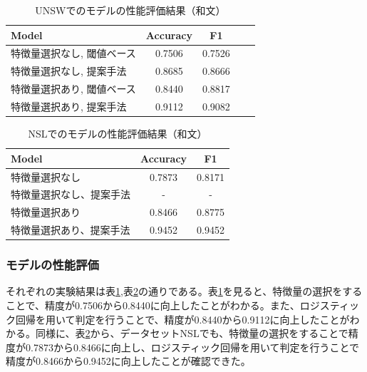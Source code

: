 \documentclass{css}
\begin{document}
\begin{table}[tb]
    \caption{UNSWでのモデルの性能評価結果（和文）}
    \centering
    \footnotesize
    \begin{tabular}{lcccc}
        \hline\hline
        Model & Accuracy & F1 \\
        \hline
        特徴量選択なし, 閾値ベース & 0.7506 & 0.7526 \\
        特徴量選択なし, 提案手法 & 0.8685 & 0.8666 \\
        特徴量選択あり, 閾値ベース & 0.8440 & 0.8817 \\
        特徴量選択あり, 提案手法 & 0.9112 & 0.9082 \\
        \hline
    \end{tabular}
    \label{tab:model_performance_UNSW}
\end{table}

\begin{table}[tb]
    \caption{NSLでのモデルの性能評価結果（和文）}
    \centering
    \footnotesize
    \begin{tabular}{lcc}
        \hline\hline
        Model & Accuracy & F1 \\
        \hline
        特徴量選択なし & 0.7873 & 0.8171 \\
        特徴量選択なし、提案手法 & - & -\\ 
        特徴量選択あり & 0.8466 & 0.8775 \\
        特徴量選択あり、提案手法 & 0.9452 & 0.9452 \\
        \hline
    \end{tabular}
    \label{tab:model_performance_NSL}
\end{table}

\subsubsection{モデルの性能評価}
それぞれの実験結果は表\ref{tab:model_performance_UNSW},表\ref{tab:model_performance_NSL}の通りである。表\ref{tab:model_performance_UNSW}を見ると、特徴量の選択をすることで、精度が0.7506から0.8440に向上したことがわかる。また、ロジスティック回帰を用いて判定を行うことで、精度が0.8440から0.9112に向上したことがわかる。同様に、表\ref{tab:model_performance_NSL}から、データセットNSLでも、特徴量の選択をすることで精度が0.7873から0.8466に向上し、ロジスティック回帰を用いて判定を行うことで精度が0.8466から0.9452に向上したことが確認できた。
\end{document}
